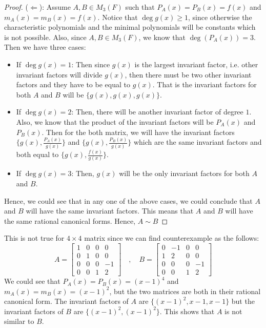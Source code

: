 \begin{answer}
\begin{proof}
        ($\Leftarrow$): Assume $A,B \in M_3(F)$ such that $P_A(x) = P_B(x) = f(x)$ and $m_A(x) = m_B(x) = f(x)$. Notice that $\deg g(x) \geq 1$, since otherwise the characteristic polynomials and the minimal polynomials will be constants which is not possible. Also, since $A,B \in M_3(F)$, we know that $\deg (P_A(x)) = 3$. Then we have three cases:
        \begin{itemize}
            \item If $\deg g(x) = 1$: Then since $g(x)$ is the largest invariant factor, i.e. other invariant factors will divide $g(x)$, then there must be two other invariant factors and they have to be equal to $g(x)$. That is the invariant factors for both $A$ and $B$ will be $\{g(x),g(x),g(x)\}$.
            \item If $\deg g(x) = 2$: Then, there will be another invariant factor of degree $1$. Also, we know that the product of the invariant factors will be $P_A(x)$ and $P_B(x)$. Then for the both matrix, we will have the invariant factors $\{g(x),\tfrac{P_A(x)}{g(x)}\}$ and $\{g(x),\tfrac{P_B(x)}{g(x)}\}$ which are the same invariant factors and both equal to $\{g(x),\tfrac{f(x)}{g(x)}\}$.
            \item If $\deg g(x) = 3$: Then, $g(x)$ will be the only invariant factors for both $A$ and $B$.
        \end{itemize}
        Hence, we could see that in any one of the above cases, we could conclude that $A$ and $B$ will have the same invariant factors. This means that $A$ and $B$ will have the same rational canonical forms. Hence, $A \sim B$
    \end{proof}
    This is not true for $4 \times 4$ matrix since we can find counterexample as the follows:
    \begin{equation}
        A = \left[
        \begin{matrix}
            1 & 0 & 0 & 0\\
            0 & 1 & 0 & 0\\
            0 & 0 & 0 & -1\\
            0 & 0 & 1 & 2
        \end{matrix}
        \right]
        \quad, \quad 
        B = \left[
        \begin{matrix}
            0 & -1 & 0 & 0\\
            1 & 2 & 0 & 0\\
            0 & 0 & 0 & -1\\
            0 & 0 & 1 & 2
        \end{matrix}
        \right]
    \end{equation}
    We could see that $P_A(x) = P_B(x) = (x-1)^4$ and $m_A(x) = m_B(x) = (x-1)^2$, but the two matrices are both in their rational canonical form. The invariant factors of $A$ are $\{(x-1)^2,x-1,x-1\}$ but the invariant factors of $B$ are $\{(x-1)^2,(x-1)^2\}$. This shows that $A$ is not similar to $B$.
\end{answer}